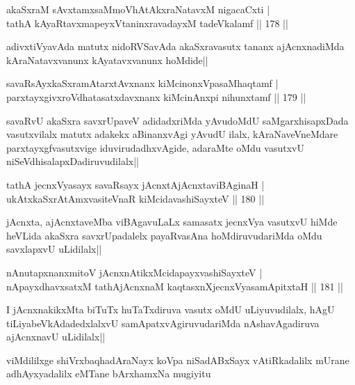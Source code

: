 \begin{shl}
akaSxraM sAvxtamxsaMmoVhAtAkxraNatavxM nigacaCxti |\\
tathA kAyaRtavxmapeyxVtaninxravadayxM tadeVkalamf \hfill || 178 ||
\end{shl}

\begin{artha}
adivxtiVyavAda matutx nidoRVSavAda akaSxravasutx tananx ajAcnxnadiMda kAraNatavxvanunx kAyatavxvanunx hoMdide||
\end{artha}

\begin{shl}
savaRsAyxkaSxramAtarxtAvxnanx kiMcinonxVpasaMhaqtamf |\\
parxtayxgivxroVdhatasatxdavxnanx kiMcinAnxpi nihunxtamf \hfill || 179 ||
\end{shl}

\begin{artha}
savaRvU akaSxra savxrUpaveV adidadxriMda yAvudoMdU saMgarxhisapxDada vasutxvilalx matutx adakekx aBinanxvAgi yAvudU ilalx, kAraNaveVneMdare parxtayxgfvasutxvige iduvirudadhxvAgide, adaraMte oMdu vasutxvU niSeVdhisalapxDadiruvudilalx||
\end{artha}%

\begin{shl}
tathA jecnxVyasayx savaRsayx jAcnxtAjAcnxtaviBAginaH |\\
ukAtxkaSxrAtAmxvasiteVnaR kiMcidavashiSayxteV \hfill || 180 ||
\end{shl}

\begin{artha}
jAcnxta, ajAcnxtaveMba viBAgavuLaLx samasatx jecnxVya vasutxvU hiMde heVLida akaSxra savxrUpadalelx payaRvasAna hoMdiruvudariMda oMdu savxlapxvU uLidilalx||
\end{artha}

\begin{shl}
nAnutapxnanxmitoV jAcnxnAtikxMcidapayxvashiSayxteV |\\
nApayxdhavxsatxM tathA\s jAcnxnaM kaqtasxnXjecnxVyasamApitxtaH \hfill || 181 ||
\end{shl}

\begin{artha}
I jAcnxnakikxMta biTuTx huTaTxdiruva vasutx oMdU uLiyuvudilalx, hAgU tiLiyabeVkAdadedxlalxvU samApatxvAgiruvudariMda nAshavAgadiruva ajAcnxnavU uLidilalx||
\end{artha}

\begin{center}
viMdililxge shiVrxbaqhadAraNayx koVpa niSadABxSayx vAtiRkadalilx mUrane adhAyxyadalilx eMTane bArxhamxNa mugiyitu
\end{center}

